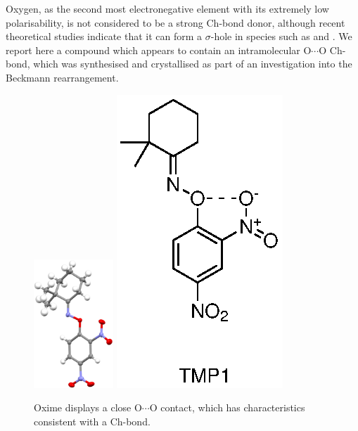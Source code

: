 \begin{refsection}
Oxygen, as the second most electronegative element with its extremely low polarisability, is not considered to be a strong Ch-bond donor, although recent theoretical studies indicate that it can form a $\sigma$-hole in species such as  and .\autocite{Varadwaj2019a,Varadwaj2019} 
We report here a compound which appears to contain an intramolecular O$\cdots$O Ch-bond, which was synthesised and crystallised as part of an investigation into the Beckmann rearrangement.\autocite{Yeoh2012}

\begin{figure}
\centering
\includegraphics[width=3cm]{Figures/dimethylcyclohexanone-oxime-dnp-xray.png}
\hspace{0.5cm}
\includegraphics[scale=0.8]{Figures/dimethylcyclohexanone-oxime-dnp.eps}	
\caption{Oxime  displays a close O$\cdots$O contact, which has characteristics consistent with a Ch-bond.}
\label{fig:dimethylcyclohexanone-oxime-dn}
\end{figure}


\end{refsection}
